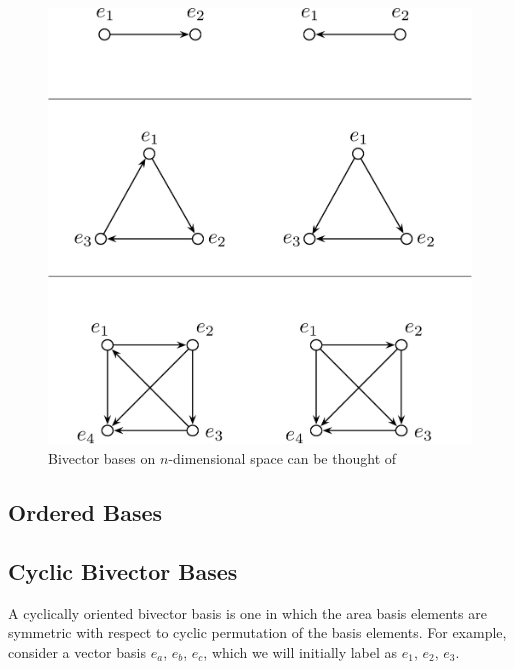 \documentclass[11pt]{article}
\newcommand{\bv}[1][]{e_{#1}}
\newcommand{\bp}[2]{(#1,#2)}
\begin{document}
\begin{figure}[tbp]
\begin{center}
\includegraphics[width=.75\textwidth]{DirectedGraphBasis}
\caption{Bivector bases on $n$-dimensional space can be thought of }
\label{fig:DirectedGraphBasis}
\end{center}
\end{figure}


\subsection{Ordered Bases}

\subsection{Cyclic Bivector Bases}
\label{sec:cyclicbivector}


A cyclically oriented bivector basis is one in which the area basis elements are symmetric with respect to cyclic permutation of the basis elements. For example, consider a vector basis $\bv[a]$, $\bv[b]$, $\bv[c]$, which we will initially label as $\bv[1]$, $\bv[2]$, $\bv[3]$. 
\end{document}
